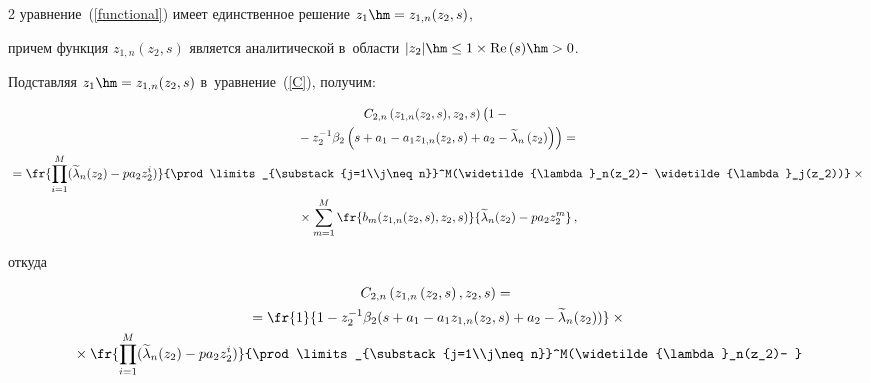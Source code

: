 \begin{multicols}{2}
уравнение~(\ref{functional}) имеет единственное решение $z_1\hm=z_{1,n}(z_2,s)$, 


причем функция $z_{1,n}(z_2,s)$ является аналитической в~области $|z_2|\hm\leq 


1\times\mathrm{Re}\,(s)\hm>0$.





Подставляя $z_1\hm=z_{1,n}(z_2,s)$ в~уравнение~(\ref{C}), получим:


\begin{multline}


C_{2,n}\left(z_{1,n}(z_2,s),z_2,s\right)


\left(\vphantom{\tilde{\lambda}_n}


1-{}\right.\\


\left.{}-z_2^{-1}\beta_2\left(s+a_1-a_1 z_{1,n}(z_2,s)+a_2-\widetilde{\lambda}_n\left(z_2\right)


\right)\right)={}\\


{}=\fr{\prod\limits_{i=1}^M(\widetilde{\lambda}_n(z_2)-pa_2 z_2^i)}


{\prod\limits_{\substack{j=1\\j\neq n}}^M(\widetilde{\lambda}_n(z_2)-


\widetilde{\lambda}_j(z_2))}\times{}\\


{}\times


\sum\limits_{m=1}^M


\fr{b_m(z_{1,n}(z_2,s),z_2,s)}{\widetilde{\lambda}_n(z_2)-pa_2 z_2^m}\,,


\label{findpi1}


\end{multline}


откуда


\begin{multline*}


C_{2,n}\left(z_{1,n}\left(z_2,s\right),z_2,s\right)={}\\


{}=


\fr{1}{1-z_2^{-1}\beta_2(s+a_1-a_1 z_{1,n}(z_2,s)+


a_2-\widetilde{\lambda}_n(z_2))}\times{}\\


{}\times


\fr{\prod\limits_{i=1}^M(\widetilde{\lambda}_n(z_2)-pa_2 z_2^i)}


{\prod\limits_{\substack{j=1\\j\neq n}}^M(\widetilde{\lambda}_n(z_2)-


}
\end{multline*}
\end{multicols}
